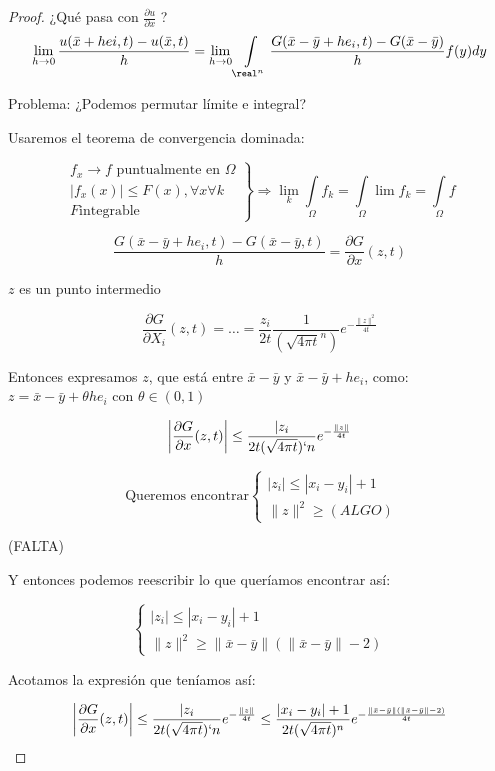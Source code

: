 		\begin{proof}
			¿Qué pasa con $\frac{\partial u}{\partial x}$ ?
			\[ \lim_{h \to 0} \frac{u(\bar{x} + hei,t)-u(\bar{x},t)}{h} = \lim_{h \to 0} \int\limits_{\real^n} \frac{G(\bar{x}-\bar{y}+he_i,t)-G(\bar{x}-\bar{y})}{h} f(y) dy
			\]

			Problema: ¿Podemos permutar límite e integral?

			Usaremos el teorema de convergencia dominada:

			\[\left. \begin{array}{r}
				f_x \to f \text{ puntualmente en } \Omega \\
				|f_x(x)| \leq F(x), \forall x \forall k \\
				F \text{integrable}
			\end{array} \right\} \Rightarrow \lim_k \int\limits_{\Omega} f_k = \int\limits_\Omega \lim f_k = \int\limits_\Omega f\]

			\[ \frac{G(\bar{x}-\bar{y}+he_i,t)-G(\bar{x}-\bar{y},t)}{h} = \frac{\partial G}{\partial x}(z,t) \]

			$z$ es un punto intermedio

			\[\frac{\partial G}{\partial X_i}(z,t) = … = \frac{z_i}{2t} \frac{1}{(\sqrt{4\pi t}^n)} e^{-\frac{\|z\|^2}{4t}}\]

			Entonces expresamos $z$, que está entre $\bar{x}-\bar{y}$ y $\bar{x}-\bar{y}+he_i$, como: $z = \bar{x} - \bar{y} + \theta h e_i$ con $\theta \in (0,1)$

			\[ \left| \frac{\partial G}{\partial x}(z,t) \right|  \leq \frac{|z_i}{2t (\sqrt{4\pi t})`n} e^{-\frac{\|z\|}{4t}}\]

			\[\text{ Queremos encontrar} \begin{cases}
				|z_i| \leq |x_i - y_i| + 1 \\
				\| z\|^2 \geq (ALGO)
			\end{cases}\]

			(FALTA)

			Y entonces podemos reescribir lo que queríamos encontrar así:

			\[\begin{cases}
				|z_i| \leq |x_i - y_i| + 1 \\
				\| z\|^2 \geq \|\bar{x}-\bar{y}\| (\|\bar{x}-\bar{y}\| -2)
			\end{cases}\]

			Acotamos la expresión que teníamos así:

			\[ \left| \frac{\partial G}{\partial x}(z,t) \right|  \leq \frac{|z_i}{2t (\sqrt{4\pi t})`n} e^{-\frac{\|z\|}{4t}} \leq \frac{|x_i-y_i| +1}{2t(\sqrt{4 \pi t})^n} e^{-\frac{\|\bar{x}-\bar{y}\| (\|\bar{x}-\bar{y}\| -2)}{4t}}\]


\end{proof}
